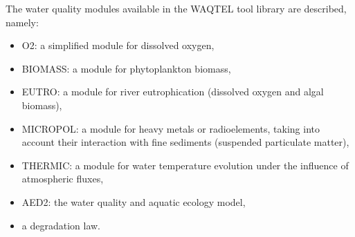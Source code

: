 \documentclass[Waqtel]{../../data/TelemacDoc} %
\begin{document}
The water quality modules available in the WAQTEL tool library are described,
namely:

\begin{itemize}
\item O2: a simplified module for dissolved oxygen,
\item BIOMASS: a module for phytoplankton biomass,
\item EUTRO: a module for river eutrophication (dissolved oxygen and algal biomass),
\item MICROPOL: a module for heavy metals or radioelements,
  taking into account their interaction with fine sediments (suspended particulate matter),
\item THERMIC: a module for water temperature evolution under the influence of atmospheric fluxes,
\item AED2: the water quality and aquatic ecology model,
\item a degradation law.
\end{itemize}




%



\end{document}
